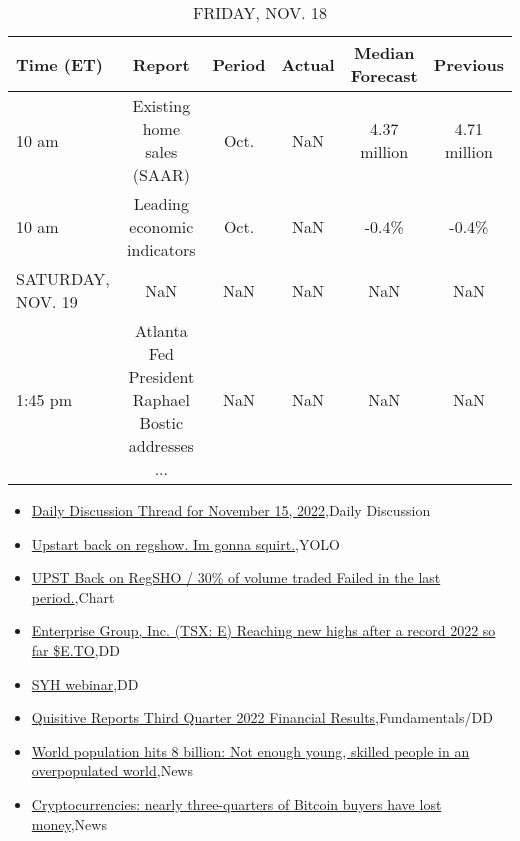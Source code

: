 \documentclass{article}%
\begin{document}
\begin{table}[htbp]%
\caption{FRIDAY, NOV. 18}%
\centering%
\begin{adjustbox}{width=1\textwidth}%
\begin{tabular}{lccccc}
\toprule
        Time (ET) &                                             Report & Period & Actual & Median Forecast &     Previous \\
\midrule
            10 am &                         Existing home sales (SAAR) &   Oct. &    NaN &    4.37 million & 4.71 million \\
            10 am &                        Leading economic indicators &   Oct. &    NaN &           -0.4\% &        -0.4\% \\
SATURDAY, NOV. 19 &                                                NaN &    NaN &    NaN &             NaN &          NaN \\
          1:45 pm & Atlanta Fed President Raphael Bostic addresses ... &    NaN &    NaN &             NaN &          NaN \\
\bottomrule
\end{tabular}
%
\end{adjustbox}%
\end{table}

%
\begin{itemize}%
\item%
\href{https://reddit.com/r/wallstreetbets/comments/yvtvqv/daily\_discussion\_thread\_for\_november\_15\_2022/}{Daily Discussion Thread for November 15, 2022},Daily Discussion%
\item%
\href{https://reddit.com/r/wallstreetbets/comments/yvo3pt/upstart\_back\_on\_regshow\_im\_gonna\_squirt/}{Upstart back on regshow. Im gonna squirt.},YOLO%
\item%
\href{https://reddit.com/r/wallstreetbets/comments/yvnpgj/upst\_back\_on\_regsho\_30\_of\_volume\_traded\_failed\_in/}{UPST Back on RegSHO / 30\% of volume traded Failed in the last period.},Chart%
\item%
\href{https://reddit.com/r/Baystreetbets/comments/yvwbi2/enterprise\_group\_inc\_tsx\_e\_reaching\_new\_highs/}{Enterprise Group, Inc. (TSX: E) Reaching new highs after a record 2022 so far \$E.TO},DD%
\item%
\href{https://reddit.com/r/Baystreetbets/comments/yvgurg/syh\_webinar/}{SYH webinar},DD%
\item%
\href{https://reddit.com/r/StockMarket/comments/yvpxby/quisitive\_reports\_third\_quarter\_2022\_financial/}{Quisitive Reports Third Quarter 2022 Financial Results},Fundamentals/DD%
\item%
\href{https://reddit.com/r/Economics/comments/yvtl7t/world\_population\_hits\_8\_billion\_not\_enough\_young/}{World population hits 8 billion: Not enough young, skilled people in an overpopulated world},News%
\item%
\href{https://reddit.com/r/Economics/comments/yvq3fq/cryptocurrencies\_nearly\_threequarters\_of\_bitcoin/}{Cryptocurrencies: nearly three-quarters of Bitcoin buyers have lost money},News%
\end{itemize}%
\end{document}
